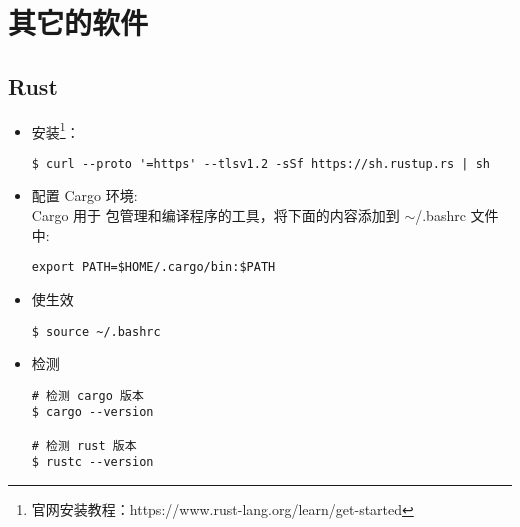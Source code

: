 \chapter{其它的软件}
\section{Rust}

\begin{itemize}
\item 安装\footnote{官网安装教程：https://www.rust-lang.org/learn/get-started}：
\begin{lstlisting}
$ curl --proto '=https' --tlsv1.2 -sSf https://sh.rustup.rs | sh
\end{lstlisting}
	
\item 配置 Cargo 环境:\\ 
Cargo 用于 包管理和编译程序的工具，将下面的内容添加到 $ \sim $/.bashrc 文件中: \\ 
\begin{lstlisting}
export PATH=$HOME/.cargo/bin:$PATH
\end{lstlisting}
	
\item 使生效
\begin{lstlisting}
$ source ~/.bashrc
\end{lstlisting}

\item 检测
\begin{lstlisting}
# 检测 cargo 版本
$ cargo --version

# 检测 rust 版本
$ rustc --version 
\end{lstlisting}
\end{itemize}

